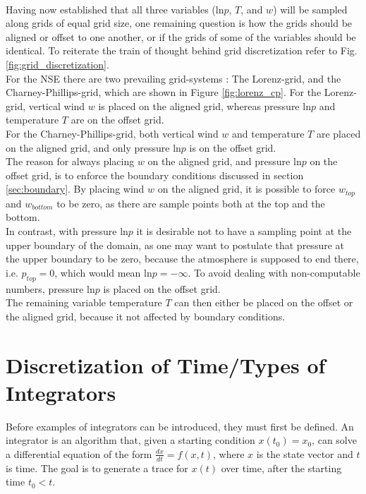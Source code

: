 \\
Having now established that all three variables ($\text{ln}p$, $T$, and $w$) will be sampled along grids of equal grid size, one remaining question is how the grids should be aligned or offset to one another, or if the grids of some of the variables should be identical.
To reiterate the train of thought behind grid discretization refer to Fig. \ref{fig:grid_discretization}.\\
For the NSE there are two prevailing grid-systems \cite{holdaway2013comparison}: The Lorenz-grid, and the Charney-Phillips-grid, which are shown in Figure \ref{fig:lorenz_cp}.
For the Lorenz-grid, vertical wind $w$ is placed on the aligned grid, whereas pressure $\text{ln}p$ and temperature $T$ are on the offset grid.\\
For the Charney-Phillips-grid, both vertical wind $w$ and temperature $T$ are placed on the aligned grid, and only pressure $\text{ln}p$ is on the offset grid.\\
The reason for always placing $w$ on the aligned grid, and pressure $\text{ln}p$ on the offset grid, is to enforce the boundary conditions discussed in section \ref{sec:boundary}.
By placing wind $w$ on the aligned grid, it is possible to force $w_{top}$ and $w_{bottom}$ to be zero, as there are sample points both at the top and the bottom.\\
In contrast, with pressure $\text{ln}p$ it is desirable not to have a sampling point at the upper boundary of the domain, as one may want to postulate that pressure at the upper boundary to be zero, because the atmosphere is supposed to end there, i.e. $p_{top}=0$, which would mean $\text{ln}p = -\infty$.
To avoid dealing with non-computable numbers, pressure $\text{ln}p$ is placed on the offset grid.\\
The remaining variable temperature $T$ can then either be placed on the offset or the aligned grid, because it not affected by boundary conditions.

\section{Discretization of Time/Types of Integrators}
Before examples of integrators can be introduced, they must first be defined.
An integrator is an algorithm that, given a starting condition $x(t_0) = x_0$, can solve a differential equation of the form $\frac{dx}{dt} = f(x,t)$, where $x$ is the state vector and $t$ is time.
The goal is to generate a trace for $x(t)$ over time, after the starting time $t_0<t$.

